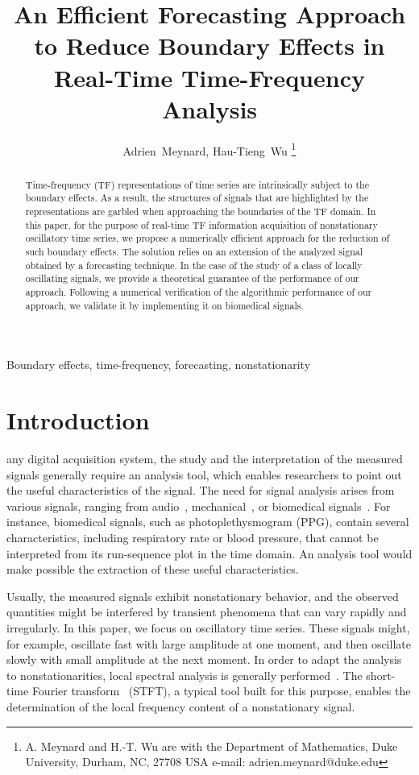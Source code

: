\documentclass[journal]{IEEEtran}
\title{An Efficient Forecasting Approach\\ to Reduce Boundary Effects in Real-Time Time-Frequency Analysis}
\author{Adrien~Meynard, %
        Hau-Tieng~Wu
\thanks{A. Meynard and H.-T. Wu are with the Department
of Mathematics, Duke University, Durham,
NC, 27708 USA e-mail: adrien.meynard@duke.edu}}
\begin{document}
\maketitle

\begin{abstract}
Time-frequency (TF) representations of time series are intrinsically subject to the boundary effects. As a result, the structures of signals that are highlighted by the representations are garbled when approaching the boundaries of the TF domain. In this paper, for the purpose of real-time TF information acquisition of nonstationary oscillatory time series, we propose a numerically efficient approach for the reduction of such boundary effects. The solution relies on an extension of the analyzed signal obtained by a forecasting technique. In the case of the study of a class of locally oscillating signals, we provide a theoretical guarantee of the performance of our approach. Following a numerical verification of the algorithmic performance of our approach, we validate it by implementing it on biomedical signals.
\end{abstract}

\begin{IEEEkeywords}
Boundary effects, time-frequency, forecasting, nonstationarity
\end{IEEEkeywords}

\section{Introduction}
\label{se:introduction}
 any digital acquisition system, the study and the interpretation of the measured signals generally require an analysis tool, which enables researchers to point out the useful characteristics of the signal. The need for signal analysis arises from various signals, ranging from audio~\cite{Stowell18computational,Muller11signal}, mechanical~\cite{Peng02vibration}, or biomedical signals~\cite{Akay96detection}. For instance, biomedical signals, such as photoplethysmogram (PPG), contain several characteristics, including respiratory rate or blood pressure, that cannot be interpreted from its run-sequence plot in the time domain. An analysis tool would make possible the extraction of these useful characteristics. 

Usually, the measured signals exhibit nonstationary behavior, and the observed quantities might be interfered by transient phenomena that can vary rapidly and irregularly. In this paper, we focus on oscillatory time series. These signals might, for example, oscillate fast with large amplitude at one moment, and then oscillate slowly with small amplitude at the next moment. In order to adapt the analysis to nonstationarities, local spectral analysis is generally performed~\cite{Stoica05spectral,Matz97generalized}. The short-time Fourier transform~\cite{Grochenig01foundations} (STFT), a typical tool built for this purpose, enables the determination of the local frequency content of a nonstationary signal.
\end{document}
